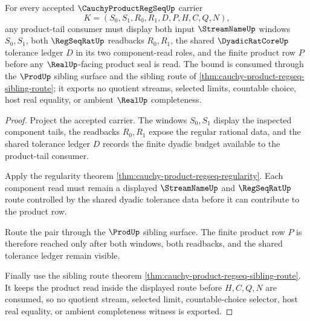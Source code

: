 \begin{theorem}
\label{thm:cauchy-product-regseq-tail-product-bound}
For every accepted $\CauchyProductRegSeqUp$ carrier
$$
K=(S_0,S_1,R_0,R_1,D,P,H,C,Q,N),
$$
any product-tail consumer must display both input $\StreamNameUp$ windows $S_0,S_1$, both $\RegSeqRatUp$ readbacks $R_0,R_1$, the shared $\DyadicRatCoreUp$ tolerance ledger $D$ in its two component-read roles, and the finite product row $P$ before any $\RealUp$-facing product seal is read. The bound is consumed through the $\ProdUp$ sibling surface and the sibling route of \autoref{thm:cauchy-product-regseq-sibling-route}; it exports no quotient streams, selected limits, countable choice, host real equality, or ambient $\RealUp$ completeness.
\end{theorem}
\begin{proof}
Project the accepted carrier. The windows $S_0,S_1$ display the inspected component tails, the readbacks $R_0,R_1$ expose the regular rational data, and the shared tolerance ledger $D$ records the finite dyadic budget available to the product-tail consumer.

Apply the regularity theorem \autoref{thm:cauchy-product-regseq-regularity}. Each component read must remain a displayed $\StreamNameUp$ and $\RegSeqRatUp$ route controlled by the shared dyadic tolerance data before it can contribute to the product row.

Route the pair through the $\ProdUp$ sibling surface. The finite product row $P$ is therefore reached only after both windows, both readbacks, and the shared tolerance ledger remain visible.

Finally use the sibling route theorem \autoref{thm:cauchy-product-regseq-sibling-route}. It keeps the product read inside the displayed route before $H,C,Q,N$ are consumed, so no quotient stream, selected limit, countable-choice selector, host real equality, or ambient completeness witness is exported.
\end{proof}

\begin{closurestatus}{\CauchyProductRegSeqUp}
  \theoryclosure{\seedClosure}
  \formalstatus{\unformalizedV}
\end{closurestatus}
